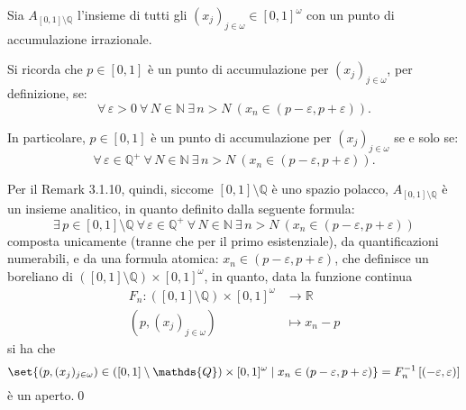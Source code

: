 \documentclass{article}
\newcommand{\1}{\mathds{1}}
\newcommand{\R}{\mathds{R}}
\newcommand{\Q}{\mathds{Q}}
\newcommand{\N}{\mathds{N}}
\begin{document}
Sia \(A_{[0,1]\setminus\Q}\) l'insieme di tutti gli \((x_{j})_{j \in \omega} \in [0,1]^{\omega}\) con un punto di accumulazione irrazionale.

Si ricorda che \(p \in [0,1]\) è un punto di accumulazione per \((x_{j})_{j \in \omega}\), per definizione, se:
\begin{equation*}
\forall\, \varepsilon > 0 \ \forall\, N \in \N\ \exists\, n > N\ \left(x_{n} \in (p-\varepsilon,p+\varepsilon)\right).
\end{equation*}

In particolare, \(p \in [0,1]\) è un punto di accumulazione per \((x_{j})_{j \in \omega}\) se e solo se:
\begin{equation*}
\forall\, \varepsilon \in \Q^{+} \ \forall\, N \in \N\ \exists\, n > N\ \left(x_{n} \in (p-\varepsilon,p +\varepsilon)\right).
\end{equation*}

Per il Remark 3.1.10, quindi, siccome \([0,1]\setminus \Q\) è uno spazio polacco, \(A_{[0,1]\setminus \Q}\) è un insieme analitico, in quanto definito dalla seguente formula:
\begin{equation*}
\exists\, p \in [0,1]\setminus \Q\ \forall\, \varepsilon \in \Q^{+} \ \forall\, N \in \N\ \exists\, n > N\ \left(x_{n} \in (p-\varepsilon,p +\varepsilon)\right)
\end{equation*}
composta unicamente (tranne che per il primo esistenziale), da quantificazioni numerabili, e da una formula atomica: \(x_{n} \in (p-\varepsilon,p+\varepsilon)\), che definisce un boreliano di \(([0,1]\setminus \Q)\times [0,1]^{\omega}\), in quanto, data la funzione continua
\begin{align*}
F_{n}: ([0,1]\setminus \Q)\times [0,1]^{\omega}  &\longrightarrow \R\\
\left(p,(x_{j})_{j \in \omega}\right) &\longmapsto x_{n}-p
\end{align*}
si ha che
\begin{equation*}
\set{\left(p,(x_{j})_{j \in \omega}\right) \in ([0,1]\setminus \Q)\times [0,1]^{\omega}\mid x_{n} \in (p-\varepsilon,p+\varepsilon)} = F_{n}^{-1}\left[(-\varepsilon,\varepsilon)\right]
\end{equation*}
è un aperto.\qed
\end{document}
